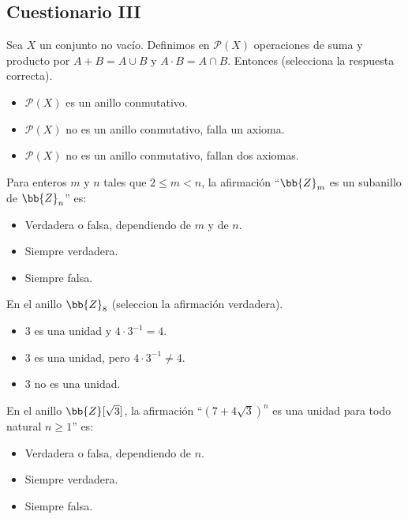 \subsection{Cuestionario III}
\begin{ejercicio}
    Sea $X$ un conjunto no vacío. Definimos en $\mathcal{P}(X)$ operaciones de suma y producto por $A+B = A \cup B$ y $A \cdot B = A \cap B$. Entonces (selecciona la respuesta correcta).
    \begin{itemize}
        \item $\mathcal{P}(X)$ es un anillo conmutativo.
        \item $\mathcal{P}(X)$ no es un anillo conmutativo, falla un axioma.
        \item $\mathcal{P}(X)$ no es un anillo conmutativo, fallan dos axiomas.
    \end{itemize}
\end{ejercicio}

\begin{ejercicio}
    Para enteros $m$ y $n$ tales que $2 \leq m < n$, la afirmación ``$\bb{Z}_m$ es un subanillo de $\bb{Z}_n$'' es:
    \begin{itemize}
        \item Verdadera o falsa, dependiendo de $m$ y de $n$.
        \item Siempre verdadera.
        \item Siempre falsa.
    \end{itemize}
\end{ejercicio}

\begin{ejercicio}
    En el anillo $\bb{Z}_8$ (seleccion la afirmación verdadera).
    \begin{itemize}
        \item $3$ es una unidad y $4 \cdot 3^{-1} = 4$.
        \item $3$ es una unidad, pero $4 \cdot 3^{-1} \neq 4$.
        \item $3$ no es una unidad.
    \end{itemize}
\end{ejercicio}

\begin{ejercicio}
    En el anillo $\bb{Z}[\sqrt{3}]$, la afirmación ``$(7+4\sqrt{3})^n$ es una unidad para todo natural $n \geq 1$'' es:
    \begin{itemize}
        \item Verdadera o falsa, dependiendo de $n$.
        \item Siempre verdadera.
        \item Siempre falsa.
    \end{itemize}
\end{ejercicio}

